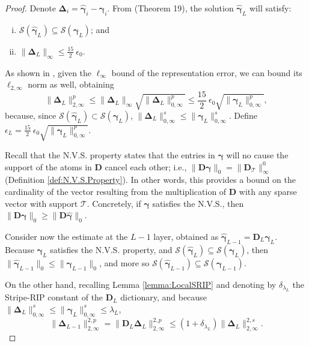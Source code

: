 \documentclass[10pt,journal]{IEEEtran}
\def\D{{\mathbf D}}
\def\S{{\mathcal{S}}}
\def\gama{{\boldsymbol \gamma}}
\def\Delt{{\boldsymbol \Delta}}
\theoremstyle{plain}
\theoremstyle{definition}
\begin{document}
\begin{proof}
	Denote $ \Delt_i = \hat{\gama}_i - \gama_i $.
	From \cite{WorkingLocallyThinkingGlobally} (Theorem 19), the solution $\hat{\gama}_L$ will satisfy:
	\begin{enumerate}[i)]
		\item $\S(\hat{\gama}_L) \subseteq \S(\gama_L)$; and
		\item $\|\Delt_L\|_\infty \leq  \frac{15}{2}\ \epsilon_0$.
	\end{enumerate}
	
	As shown in \cite{Papyan2016convolutional}, given the $\ell_\infty$ bound of the representation error, we can bound its $\ell_{2,\infty}$ norm as well, obtaining
	\begin{equation}
	\label{Eq:BoundOnEl}
	\| \Delt_L \|^p_{2,\infty} \leq \|\Delt_L\|_\infty \sqrt{\|\Delt_L\|^p_{0,\infty}} \leq \frac{15}{2}\ \epsilon_0 \sqrt{\|\gama_L\|^p_{0,\infty}},
	\end{equation}
	because, since $\S(\hat{\gama}_L) \subset \S(\gama_L)$, $\| \Delt_{L}\|^s_{0,\infty} \leq \|\gama_L\|^s_{0,\infty}$.	 Define $\epsilon_L = \frac{15}{2}\ \epsilon_0 \sqrt{\|\gama_L\|^p_{0,\infty}}$.
	
	Recall that the N.V.S. property states that the entries in $\gama$ will no cause the support of the atoms in $\D$ cancel each other; i.e., $\|\D\gama\|_0 = \|\D_{\mathcal{T}}\|^0_{\infty}$ (Definition \ref{def:N.V.S.Property}). In other words, this provides a bound on the cardinality of the vector resulting from the multiplication of $\D$ with any sparse vector with support $\mathcal{T}$. Concretely, if $\gama$ satisfies the N.V.S., then $\|\D\gama\|_0 \geq \|\D\hat{\gama}\|_0$.
	
	Consider now the estimate at the $L-1$ layer, obtained as $\hat{\gama}_{L-1} = \D_L \hat{\gama}_{L}$. Because $\gama_L$ satisfies the N.V.S. property, and $\S(\hat{\gama}_L) \subseteq \S(\gama_L)$, then $\|\hat{\gama}_{L-1}\|_0 \leq \|\gama_{L-1}\|_0$, and more so  $\S(\hat{\gama}_{L-1}) \subseteq \S(\gama_{L-1})$.
	
	
	
	On the other hand, recalling Lemma \ref{lemma:LocalSRIP} and denoting by $\delta_{\lambda_L}$ the Stripe-RIP constant of the $\D_L$ dictionary, and because $\| \Delt_{L}\|^s_{0,\infty} \leq \|\gama_L\|^s_{0,\infty} \leq \lambda_L$,
	\begin{equation}
	\| \Delt_{L-1} \|^{2,p}_{2,\infty} = \| \D_L \Delt_{L} \|^{2,p}_{2,\infty} \leq (1+\delta_{\lambda_L}) \| \Delt_{L} \|^{2,s}_{2,\infty}.
	\end{equation}
	

\end{proof}
\end{document}
